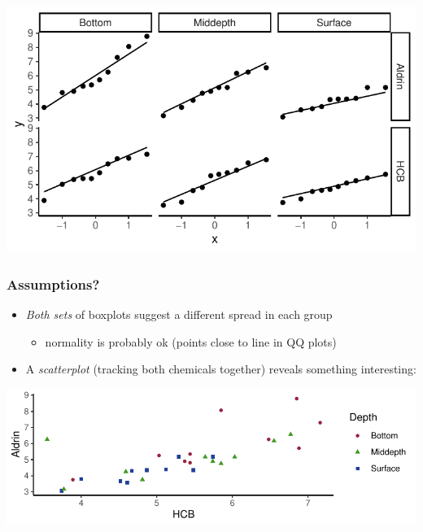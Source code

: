 \documentclass[a4paper]{article}
\begin{document}
\begin{Schunk}
{\centering \includegraphics[width=\maxwidth]{figure/listings-unnamed-chunk-257-2} 

}

\end{Schunk}
\subsubsection{Assumptions?}
\begin{itemize}
	\item \textit{Both sets} of boxplots suggest a different spread in each group
	\begin{itemize}
		\item normality is probably ok (points close to line in QQ plots)
	\end{itemize}
	\item A \textit{scatterplot} (tracking both chemicals together) reveals something interesting:
\end{itemize}
\begin{Schunk}


{\centering \includegraphics[width=\maxwidth]{figure/listings-unnamed-chunk-258-1} 

}

\end{Schunk}
\end{document}
